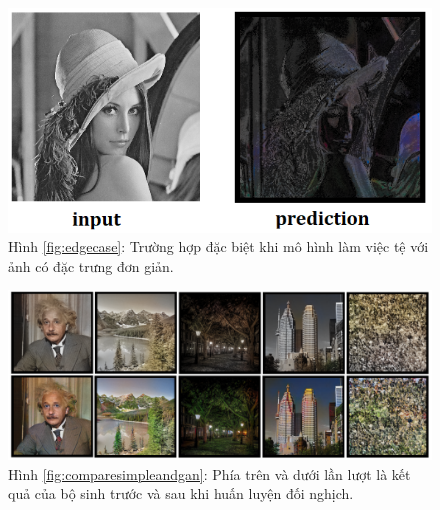 \documentclass[a4paper, 12pt]{article}
\begin{document}
\begin{figure}[!h]
\captionsetup{width=0.8\textwidth}
\centering
\includegraphics[width=12cm]{images/4_13.png}
\caption*{Hình \ref{fig:edgecase}: Trường hợp đặc biệt khi mô hình làm việc tệ với ảnh có đặc trưng đơn giản.}
\end{figure}

\begin{figure}[!h]
\captionsetup{width=0.8\textwidth}
\centering
\includegraphics[width=15cm]{images/4_3.PNG}
\caption*{Hình \ref{fig:comparesimpleandgan}: Phía trên và dưới lần lượt là kết quả của bộ sinh trước và sau khi huấn luyện đối nghịch.}
\end{figure}
\end{document}
